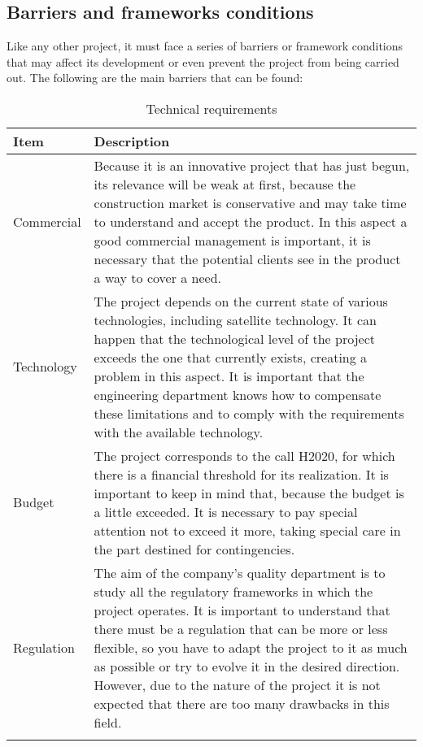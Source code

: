 \subsection{Barriers and frameworks conditions}

Like any other project, it must face a series of barriers or framework conditions that may affect its development or even prevent the project from being carried out. The following are the main barriers that can be found:

\begin{longtable}[H]{l p{12cm}}
		
		\toprule[2pt]
		
		\textbf{Item} &  \textbf{Description}\\
		
		\midrule [1.5pt]
		
		Commercial & Because it is an innovative project that has just begun, its relevance will be weak at first, because the construction market is conservative and may take time to understand and accept the product.
		In this aspect a good commercial management is important, it is necessary that the potential clients see in the product a way to cover a need.
		\vspace{0.2cm}\\
		
		\midrule
		
		Technology & The project depends on the current state of various technologies, including satellite technology. It can happen that the technological level of the project exceeds the one that currently exists, creating a problem in this aspect. It is important that the engineering department knows how to compensate these limitations and to comply with the requirements with the available technology.\vspace{0.2cm}\\
		
		\midrule
		
		Budget & The project corresponds to the call H2020, for which there is a financial threshold for its realization. It is important to keep in mind that, because the budget is a little exceeded. It is necessary to pay special attention not to exceed it more, taking special care in the part destined for contingencies.\vspace{0.2cm}\\
		
		\midrule
		
		Regulation & The aim of the company's quality department is to study all the regulatory frameworks in which the project operates. It is important to understand that there must be a regulation that can be more or less flexible, so you have to adapt the project to it as much as possible or try to evolve it in the desired direction. However, due to the nature of the project it is not expected that there are too many drawbacks in this field.\vspace{0.2cm}\\
		
		
		\bottomrule[2pt]
		
	\caption{Technical requirements}
\end{longtable}